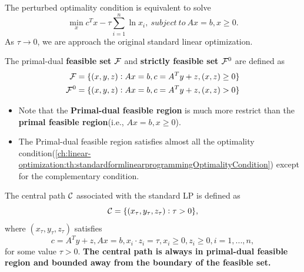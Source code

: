 \begin{refsection}
\begin{remark}
	
\end{remark}

\begin{remark}\cite[397]{nocedal2006numerical}
The perturbed optimality condition is equivalent to solve 
$$\min_{x} c^Tx - \tau \sum_{i=1}^n \ln x_i, ~subject~to~ Ax = b, x \geq 0.$$
As $\tau \to 0$, we are approach the original standard linear optimization.
\end{remark}


\begin{definition}
The primal-dual \textbf{feasible set} $\mathcal{F}$ and \textbf{strictly feasible set} $\mathcal{F}^0$ are defined as
\begin{align*}
\mathcal{F} & = \{(x,y,z): Ax = b, c = A^Ty + z, (x,z)\geq 0\} \\
\mathcal{F}^0 & = \{(x,y,z): Ax = b, c = A^Ty + z, (x,z)> 0\}
\end{align*}
\end{definition}

\begin{remark}\hfill
\begin{itemize}
\item Note that the \textbf{Primal-dual feasible region} is much more restrict than the \textbf{primal feasible region}(i.e., $Ax = b, x\geq 0$). 
\item The Primal-dual feasible region satisfies almost all the optimality condition(\autoref{ch:linear-optimization:th:standardformlinearprogrammingOptimalityCondition}) except for the complementary condition.
\end{itemize}
\end{remark}

\begin{definition}
	The central path $\mathcal{C}$ associated with the standard LP is defined as
	$$\mathcal{C} = \{(x_{\tau},y_{\tau},z_{\tau}): \tau > 0\},$$
	where $(x_{\tau},y_{\tau},z_{\tau})$ satisfies
	$$c = A^Ty + z, Ax = b, x_i\cdot z_i = \tau, x_i \geq 0, z_i \geq 0, i=1,...,n, $$
	for some value $\tau > 0$.
	\textbf{The central path is always in primal-dual feasible region and bounded away from the boundary of the feasible set.}
\end{definition}





\end{refsection}
